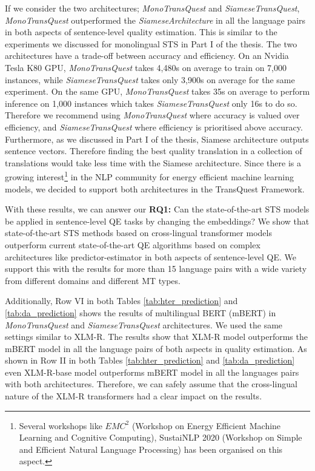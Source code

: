 If we consider the two architectures; \textit{MonoTransQuest} and \textit{SiameseTransQuest}, \textit{MonoTransQuest} outperformed the \textit{SiameseArchitecture} in all the language pairs in both aspects of sentence-level quality estimation. This is similar to the experiments we discussed for monolingual STS in Part I of the thesis. The two architectures have a trade-off between accuracy and efficiency. On an Nvidia Tesla K80 GPU, \textit{MonoTransQuest} takes 4,480s on average to train on 7,000 instances, while \textit{SiameseTransQuest} takes only 3,900s on average for the same experiment. On the same GPU, \textit{MonoTransQuest} takes 35s on average to perform inference on 1,000 instances which takes \textit{SiameseTransQuest} only 16s to do so. Therefore we recommend using \textit{MonoTransQuest} where accuracy is valued over efficiency, and \textit{SiameseTransQuest} where efficiency is prioritised above accuracy. Furthermore, as we discussed in Part I of the thesis, Siamese architecture outputs sentence vectors. Therefore finding the best quality translation in a collection of translations would take less time with the Siamese architecture. Since there is a growing interest\footnote{Several workshops like $EMC^2$ (Workshop on Energy Efficient Machine Learning and Cognitive Computing), SustaiNLP 2020 (Workshop on Simple and Efficient Natural Language Processing) has been organised on this aspect.} in the NLP community for energy efficient machine learning models, we decided to support both architectures in the TransQuest Framework. 

With these results, we can answer our \textbf{RQ1:} Can the state-of-the-art STS models be applied in sentence-level QE tasks by changing the embeddings? We show that state-of-the-art STS methods based on cross-lingual transformer models outperform current state-of-the-art QE algorithms based on complex architectures like predictor-estimator in both aspects of sentence-level QE. We support this with the results for more than 15 language pairs with a wide variety from different domains and different MT types.


Additionally, Row VI in both Tables \ref{tab:hter_prediction} and \ref{tab:da_prediction} shows the results of multilingual BERT (mBERT) in \textit{MonoTransQuest} and \textit{SiameseTransQuest} architectures. We used the same settings similar to XLM-R. The results show that XLM-R model outperforms the mBERT model in all the language pairs of both aspects in quality estimation. As shown in Row II in both Tables \ref{tab:hter_prediction} and \ref{tab:da_prediction} even XLM-R-base model outperforms mBERT model in all the languages pairs with both architectures. Therefore, we can safely assume that the cross-lingual nature of the XLM-R transformers had a clear impact on the results.


